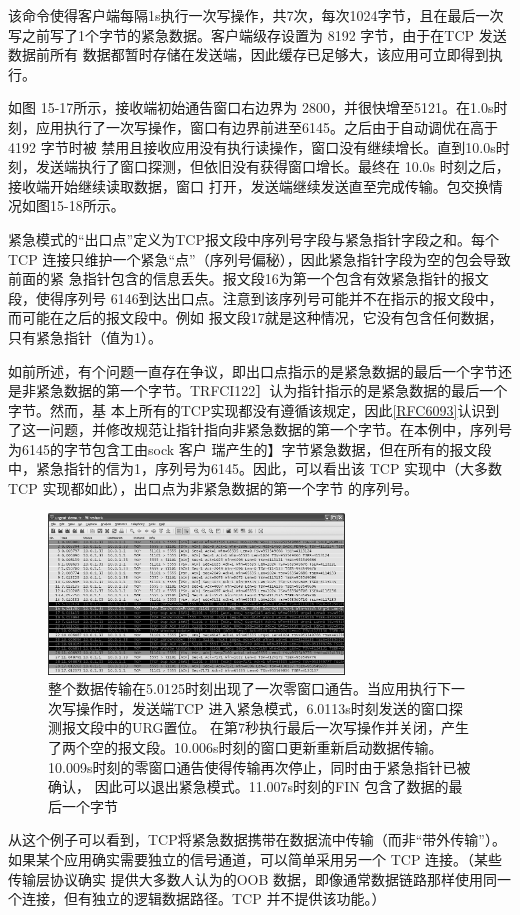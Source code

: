 该命令使得客户端每隔1s执行一次写操作，共7次，每次1024字节，且在最后一次写之前写了1个字节的紧急数据。客户端级存设置为 8192 字节，由于在TCP 发送数据前所有
数据都暂时存储在发送端，因此缓存已足够大，该应用可立即得到执行。

如图 15-17所示，接收端初始通告窗口右边界为 2800，并很快增至5121。在1.0s时刻，应用执行了一次写操作，窗口有边界前进至6145。之后由于自动调优在高于4192 字节时被
禁用且接收应用没有执行读操作，窗口没有继续增长。直到10.0s时刻，发送端执行了窗口探测，但依旧没有获得窗口增长。最终在 10.0s 时刻之后，接收端开始继续读取数据，窗口
打开，发送端继续发送直至完成传输。包交换情况如图15-18所示。

紧急模式的“出口点”定义为TCP报文段中序列号字段与紧急指针字段之和。每个TCP 连接只维护一个紧急“点”（序列号偏秘），因此紧急指针字段为空的包会导致前面的紧
急指针包含的信息丢失。报文段16为第一个包含有效紧急指针的报文段，使得序列号 6146到达出口点。注意到该序列号可能并不在指示的报文段中，而可能在之后的报文段中。例如
报文段17就是这种情况，它没有包含任何数据，只有紧急指针（值为1）。

如前所述，有个问题一直存在争议，即出口点指示的是紧急数据的最后一个字节还是非紧急数据的第一个字节。TRFCI122］认为指针指示的是紧急数据的最后一个字节。然而，基
本上所有的TCP实现都没有遵循该规定，因此\href{https://www.rfc-editor.org/rfc/rfc6093}{[RFC6093]}认识到了这一问题，并修改规范让指针指向非紧急数据的第一个字节。在本例中，序列号为6145的字节包含工由sock 客户
瑞产生的】字节紧急数据，但在所有的报文段中，紧急指针的信为1，序列号为6145。因此，可以看出该 TCP 实现中（大多数 TCP 实现都如此），出口点为非紧急数据的第一个字节
的序列号。
\begin{figure}[!htb]
    \centering
	\includegraphics[width=0.7\textwidth]{imgs/15/15-18.png}
	\caption{整个数据传输在5.0125时刻出现了一次零窗口通告。当应用执行下一次写操作时，发送端TCP 进入紧急模式，6.0113s时刻发送的窗口探测报文段中的URG置位。
    在第7秒执行最后一次写操作并关闭，产生了两个空的报文段。10.006s时刻的窗口更新重新启动数据传输。10.009s时刻的零窗口通告使得传输再次停止，同时由于紧急指针已被确认，
    因此可以退出紧急模式。11.007s时刻的FIN 包含了数据的最后一个字节}
\end{figure}
从这个例子可以看到，TCP将紧急数据携带在数据流中传输（而非“带外传输”）。如果某个应用确实需要独立的信号通道，可以简单采用另一个 TCP 连接。（某些传输层协议确实
提供大多数人认为的OOB 数据，即像通常数据链路那样使用同一个连接，但有独立的逻辑数据路径。TCP 并不提供该功能。）


